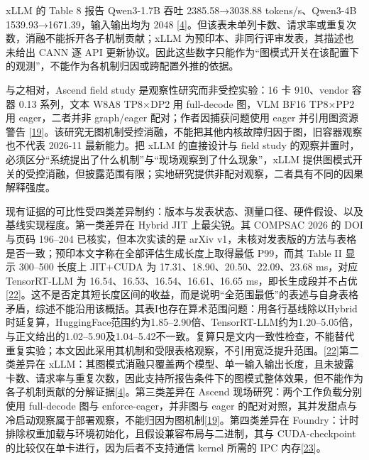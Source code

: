 \documentclass[
  UTF8,
  zihao=5]{ctexart}
\begin{document}
xLLM 的 Table 8 报告 Qwen3-1.7B 吞吐 2385.58→3038.88 tokens/s、Qwen3-4B
1539.93→1671.39，输入输出均为 2048
{[}\protect\hyperlink{ref-liu2025xllm}{4}{]}。但该表未单列卡数、请求率或重复次数，消融不能拆开各子机制贡献；xLLM
为预印本、非同行评审发表，其描述也未给出 CANN 逐 API
更新协议。因此这些数字只能作为``图模式开关在该配置下的观测''，不能作为各机制归因或跨配置外推的依据。

与之相对，Ascend field study 是观察性研究而非受控实验：16 卡 910、vendor
容器 0.13 系列，文本 W8A8 TP8×DP2 用 full-decode 图，VLM BF16 TP8×PP2 用
eager，二者并非 graph/eager 配对；作者因捕获问题使用 eager
并引用图资源警告
{[}\protect\hyperlink{ref-yu2026ascendfield}{19}{]}。该研究无图机制受控消融，不能把其他内核故障归因于图，旧容器观察也不代表
2026-11 最新能力。把 xLLM 的直接设计与 field study
的观察并置时，必须区分``系统提出了什么机制''与``现场观察到了什么现象''，xLLM
提供图模式开关的受控消融，但披露范围有限；实地研究提供非配对观察，二者具有不同的因果解释强度。

现有证据的可比性受四类差异制约：版本与发表状态、测量口径、硬件假设、以及基线实现程度。第一类差异在
Hybrid JIT 上最尖锐。其 COMPSAC 2026 的 DOI 与页码 196--204
已核实，但本次实读的是 arXiv
v1，未核对发表版的方法与表格是否一致；预印本文字称在全部评估生成长度上取得最低
P99，而其 Table II 显示 300--500 长度上 JIT+CUDA 为
17.31、18.90、20.50、22.09、23.68 ms，对应 TensorRT-LLM 为
16.54、16.53、16.54、16.61、16.65
ms，即长生成段并不占优{[}\protect\hyperlink{ref-yadav2026hybridpreprint}{22}{]}。这不是否定其短长度区间的收益，而是说明``全范围最低''的表述与自身表格矛盾，综述不能沿用该概括。其表I也存在算术范围问题：用各行基线除以Hybrid时延复算，HuggingFace范围约为1.85--2.90倍、TensorRT-LLM约为1.20--5.05倍，与正文给出的1.02--5.90及1.04--5.42不一致。复算只是文内一致性检查，不能替代重复实验；本文因此采用其机制和受限表格观察，不引用宽泛提升范围。{[}\protect\hyperlink{ref-yadav2026hybridpreprint}{22}{]}第二类差异在
xLLM：其图模式消融只覆盖两个模型、单一输入输出长度，且未披露卡数、请求率与重复次数，因此支持所报告条件下的图模式整体效果，但不能作为各子机制贡献的分解证据{[}\protect\hyperlink{ref-liu2025xllm}{4}{]}。第三类差异在
Ascend 现场研究：两个工作负载分别使用 full-decode 图与
enforce-eager，并非图与 eager
的配对对照，其并发甜点与冷启动观察属于部署观察，不能归因为图机制{[}\protect\hyperlink{ref-yu2026ascendfield}{19}{]}。第四类差异在
Foundry：计时排除权重加载与环境初始化，且假设兼容布局与二进制，其与
CUDA-checkpoint 的比较仅在单卡进行，因为后者不支持通信 kernel 所需的 IPC
内存{[}\protect\hyperlink{ref-liu2026foundry}{23}{]}。
\end{document}
